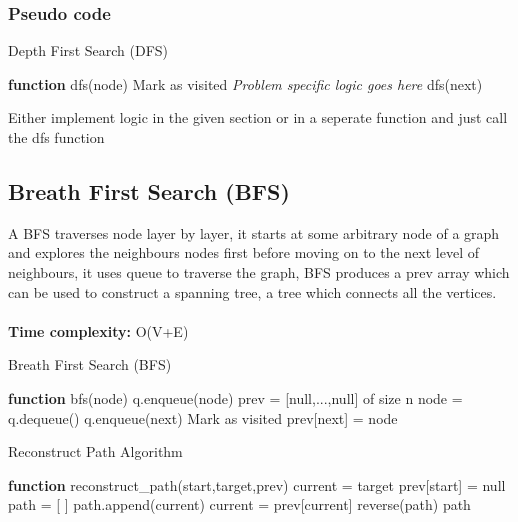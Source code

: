 \documentclass[12pt]{extarticle}
\begin{document}
\subsubsection*{Pseudo code}

\begin{algorithm} [H]
    \caption{Depth First Search (DFS)}
    \begin{algorithmic}[1]
        \STATE \textbf{function} dfs(node)
        \RETURN
        \ENDIF
        \STATE Mark as visited
        \STATE \textit{Problem specific logic goes here}
        \STATE dfs(next)
        \ENDFOR
    \end{algorithmic}
\end{algorithm}

Either implement logic in the given section or in a seperate function and just call 
the dfs function

\subsection{Breath First Search (BFS)}
A BFS traverses node layer by layer, it starts at some arbitrary node of a graph and explores the neighbours nodes first before moving on to the next level of neighbours, it uses queue to traverse the graph, BFS produces a prev array which can be used to construct
a spanning tree, a tree which connects all the vertices.\\ \\  
\textbf{Time complexity:} O(V+E)

\begin{algorithm}
    \caption {Breath First Search (BFS)}
    \begin{algorithmic}[1]
        \STATE \textbf{function} bfs(node)
        \STATE q.enqueue(node)
        \STATE prev = [null,...,null] of size n
        \STATE node = q.dequeue()
        \STATE q.enqueue(next)
        \STATE Mark as visited
        \STATE prev[next] = node
        \ENDIF
        \ENDFOR
        
        \ENDWHILE
    \end{algorithmic}
\end{algorithm}


\begin{algorithm}
\caption{Reconstruct Path Algorithm}
    \begin{algorithmic}
        \STATE \textbf{function} reconstruct\_path(start,target,prev)
        \STATE current = target
        \STATE prev[start] = null 
        \STATE path = [ ]
        \STATE path.append(current)
        \STATE current = prev[current]
        \ENDWHILE
        \STATE reverse(path)
        \RETURN path
        \ELSE
        \RETURN [ ]
        \ENDIF
    \end{algorithmic}
\end{algorithm}
\end{document}
